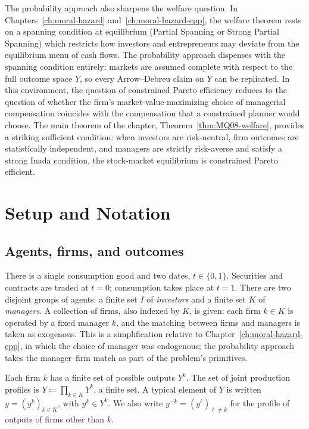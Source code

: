 \documentclass[11pt,a4paper,oneside]{book}
\theoremstyle{plain}
\theoremstyle{definition}
\theoremstyle{remark}
\numberwithin{equation}{chapter}
\begin{document}
The probability approach also sharpens the welfare question.
In Chapters~\ref{ch:moral-hazard} and~\ref{ch:moral-hazard-cpp}, the welfare theorem rests on a spanning condition at equilibrium (Partial Spanning or Strong Partial Spanning) which restricts how investors and entrepreneurs may deviate from the equilibrium menu of cash flows.
The probability approach dispenses with the spanning condition entirely: markets are assumed complete with respect to the full outcome space $Y$, so every Arrow--Debreu claim on $Y$ can be replicated.
In this environment, the question of constrained Pareto efficiency reduces to the question of whether the firm's market-value-maximizing choice of managerial compensation coincides with the compensation that a constrained planner would choose.
The main theorem of the chapter, Theorem~\ref{thm:MQ08-welfare}, provides a striking sufficient condition: when investors are risk-neutral, firm outcomes are statistically independent, and managers are strictly risk-averse and satisfy a strong Inada condition, the stock-market equilibrium is constrained Pareto efficient.

\section{Setup and Notation}
\label{sec:MQ08-setup}

\subsection{Agents, firms, and outcomes}

There is a single consumption good and two dates, $t \in \{0, 1\}$.
Securities and contracts are traded at $t = 0$; consumption takes place at $t = 1$.
There are two disjoint groups of agents: a finite set $I$ of \emph{investors} and a finite set $K$ of \emph{managers}.
A collection of firms, also indexed by $K$, is given: each firm $k \in K$ is operated by a fixed manager $k$, and the matching between firms and managers is taken as exogenous.
This is a simplification relative to Chapter~\ref{ch:moral-hazard-cpp}, in which the choice of manager was endogenous; the probability approach takes the manager--firm match as part of the problem's primitives.

Each firm $k$ has a finite set of possible outputs $Y^k$.
The set of joint production profiles is $Y \coloneqq \prod_{k \in K} Y^k$, a finite set.
A typical element of $Y$ is written $y = (y^k)_{k \in K}$, with $y^k \in Y^k$.
We also write $y^{-k} = (y^\ell)_{\ell \neq k}$ for the profile of outputs of firms other than $k$.
\end{document}
